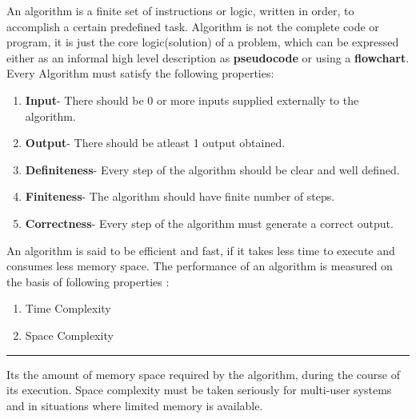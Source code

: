 \hypertarget{what-is-an-algorithm}{%
	\label{what-is-an-algorithm}}

An algorithm is a finite set of instructions or logic, written in order, to accomplish a certain predefined task. Algorithm is not the complete code or program, it is just the core logic(solution) of a problem, which can be expressed either as an informal high level description as \textbf{pseudocode} or using a \textbf{flowchart}.\\

Every Algorithm must satisfy the following properties:

\begin{enumerate}
	\tightlist
	\item
	      \textbf{Input}- There should be 0 or more inputs supplied externally
	      to the algorithm.
	\item
	      \textbf{Output}- There should be atleast 1 output obtained.
	\item
	      \textbf{Definiteness}- Every step of the algorithm should be clear and
	      well defined.
	\item
	      \textbf{Finiteness}- The algorithm should have finite number of steps.
	\item
	      \textbf{Correctness}- Every step of the algorithm must generate a
	      correct output.
\end{enumerate}

An algorithm is said to be efficient and fast, if it takes less time to execute and consumes less memory space. The performance of an algorithm is measured on the basis of following properties :

\begin{enumerate}
	\tightlist
	\item
	      Time Complexity
	\item
	      Space Complexity
\end{enumerate}

\begin{center}\rule{0.5\linewidth}{0.5pt}\end{center}

\hypertarget{space-complexity}{%
	\label{space-complexity}}

Its the amount of memory space required by the algorithm, during the course of its execution. Space complexity must be taken seriously for multi-user systems and in situations where limited memory is available.\\

